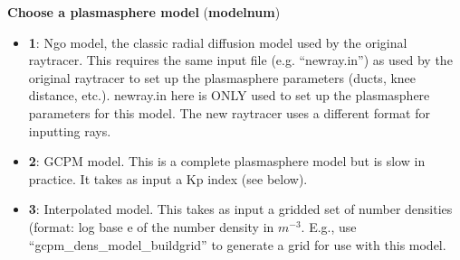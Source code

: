 \documentclass[10pt]{article}
\begin{document}
{\bf Choose a plasmasphere model} ({\bf modelnum})
\begin{itemize}
\item {\bf 1}: Ngo model, the classic radial diffusion model used
  by the original raytracer.  This requires the same input file
  (e.g. ``newray.in'') as used by the original raytracer to set
  up the plasmasphere parameters (ducts, knee distance, etc.).
  newray.in here is ONLY used to set up the plasmasphere
  parameters for this model.  The new raytracer uses a different
  format for inputting rays.
\item {\bf 2}: GCPM model.  This is a complete plasmasphere model
  but is slow in practice.  It takes as input a Kp index (see below).
\item {\bf 3}: Interpolated model.  This takes as input a gridded set
  of number densities (format: log base e of the number density in
  $m^{-3}$.  E.g., use \\``gcpm\_dens\_model\_buildgrid'' to generate
  a grid for use with this model.
\end{itemize}
\end{document}
